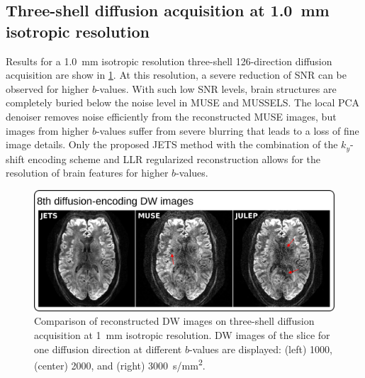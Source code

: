 \documentclass[preprint,12pt,authoryear,review]{elsarticle}
\begin{document}
    \subsection{Three-shell diffusion acquisition at \SI{1.0}{\milli\meter} isotropic resolution}

    Results for a \SI{1.0}{mm} isotropic resolution three-shell 126-direction
    diffusion acquisition are show in \cref{FIG:1.0mm_DWI}.
    At this resolution, a severe reduction of SNR can be observed
    for higher $b$-values.
    With such low SNR levels, brain structures are completely buried below the noise level
    in MUSE and MUSSELS.
    The local PCA denoiser removes noise efficiently from the reconstructed MUSE images,
    but images from higher $b$-values suffer from severe blurring that leads to
    a loss of fine image details.
    Only the proposed JETS method with the combination of the $k_y$-shift encoding scheme
    and LLR regularized reconstruction allows for the resolution of brain features for higher $b$-values.

    \begin{figure}
        \centering
        \includegraphics[width=\textwidth]{../figures/fig3.png}
        \caption{Comparison of reconstructed DW images on
            three-shell diffusion acquisition at
            \SI{1}{\milli\meter} isotropic resolution.
            DW images of the  slice for one diffusion direction at different $b$-values are displayed:
                (left) 1000, (center) 2000, and (right) 3000~\si{s/mm^2}.}
        \label{FIG:1.0mm_DWI}
    \end{figure}
\end{document}
